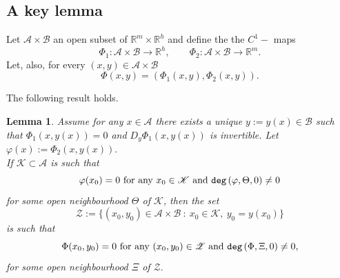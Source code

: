 \documentclass[11pt,a4paper]{amsart}
\newtheorem{lemma}[theorem]{Lemma}
\theoremstyle{definition}
\renewcommand{\(}{\left(}
\renewcommand{\)}{\right)}
\begin{document}
\subsection{A key lemma}
Let $\mathcal A\times \mathcal B$ an open subset of $\mathbb R^m\times \mathbb R^h$ and define the the $C^1-$ maps $$\Phi_1: \mathcal A\times \mathcal B \to \mathbb R^h,\quad \quad \Phi_2: \mathcal A\times \mathcal B\to \mathbb R^m.$$ Let, also, for every $(x, y)\in\mathcal A\times\mathcal B$ \begin{equation}\label{F}\Phi(x, y)=(\Phi_1(x, y), \Phi_2(x, y)).\end{equation}

The following result holds.
\begin{lemma}\label{isolated}
Assume for any $x\in\mathcal A$ there exists a unique $y:=y(x)\in\mathcal B$ such that $\Phi_1(x, y(x))=0$ and $D_y \Phi_1(x, y(x))$ is invertible. Let $\varphi(x):=\Phi_2(x, y(x)).$\\ 
If $\mathscr K\subset\mathcal A$ is such that 
$$\varphi(x_0)=0\ \hbox{for any}\ x_0\in\mathscr K\ \hbox{and}\ \mathtt{deg}\left(\varphi, \Theta,0\right)\neq 0$$
for some open neighbourhood $\Theta$ of $\mathscr K$,  then the
set
$$\mathscr Z:=\{(x_0, y_0)\in \mathcal A\times\mathcal B\ :\ x_0\in\mathscr K,\ y_0=y(x_0)\}$$ is such that 
$$\Phi(x_0, y_0)=0\ \hbox{for any}\ (x_0, y_0)\in \mathscr Z\ \hbox{and}\ \mathtt{deg}\left(\Phi, \Xi,0\right)\neq 0,$$
for some open neighbourhood $\Xi$ of $\mathscr Z.$
\end{lemma}
\end{document}
